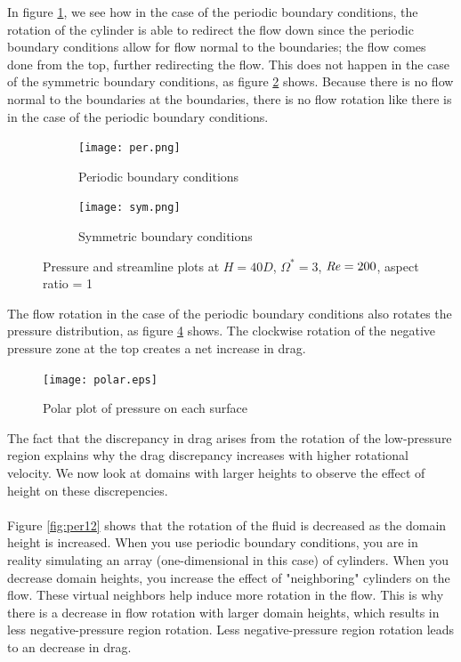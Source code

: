 \noindent In figure \ref{fig:per}, we see how in the case of the periodic boundary conditions, the rotation of the cylinder is able to redirect the flow down since the periodic boundary conditions allow for flow normal to the boundaries; the flow comes done from the top, further redirecting the flow. This does not happen in the case of the symmetric boundary conditions, as figure \ref{fig:sym} shows. Because there is no flow normal to the boundaries at the boundaries, there is no flow rotation like there is in the case of the periodic boundary conditions. 
\begin{figure}
    \centering
    \begin{subfigure}{0.49\textwidth}
    \texttt{[image: per.png]}
    \caption{Periodic boundary conditions}
    \label{fig:per}
    \end{subfigure}
    \begin{subfigure}{0.49\textwidth}
    \texttt{[image: sym.png]}
    \caption{Symmetric boundary conditions}
    \label{fig:sym}
    \end{subfigure}
    \caption{Pressure and streamline plots at $H = 40D$, $\Omega^{\ast} = 3$, $\mathit{Re} = 200$, aspect ratio = 1}
    \label{fig:per sym}
\end{figure}
The flow rotation in the case of the periodic boundary conditions also rotates the pressure distribution, as figure \ref{fig:polar pres} shows. The clockwise rotation of the negative pressure zone at the top creates a net increase in drag.
\begin{figure}
    \centerline{\texttt{[image: polar.eps]}}
    \caption{Polar plot of pressure on each surface}
    \label{fig:polar pres}
\end{figure}
\noindent The fact that the discrepancy in drag arises from the rotation of the low-pressure region explains why the drag discrepancy increases with higher rotational velocity. We now look at domains with larger heights to observe the effect of height on these discrepencies. \\\\
Figure \ref{fig:per12} shows that the rotation of the fluid is decreased as the domain height is increased. When you use periodic boundary conditions, you are in reality simulating an array (one-dimensional in this case) of cylinders. When you decrease domain heights, you increase the effect of "neighboring" cylinders on the flow. These virtual neighbors help induce more rotation in the flow. This is why there is a decrease in flow rotation with larger domain heights, which results in less negative-pressure region rotation. Less negative-pressure region rotation leads to an decrease in drag.  
